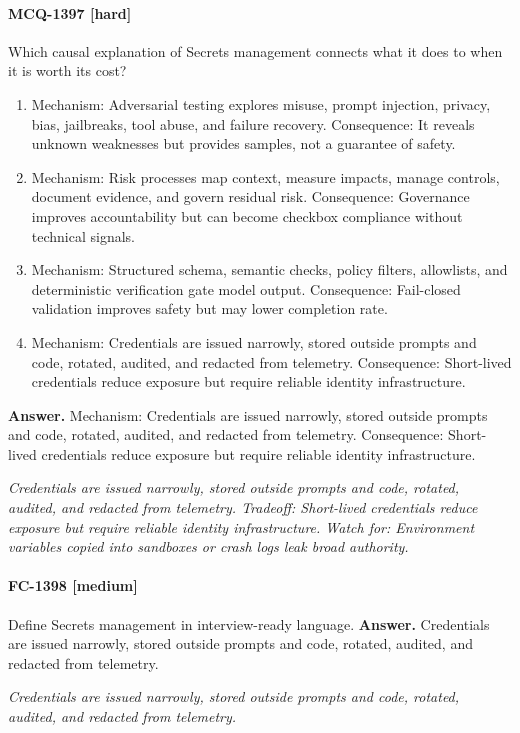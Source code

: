 \paragraph{MCQ-1397 [hard]} Which causal explanation of Secrets management connects what it does to when it is worth its cost?
\begin{enumerate}[label=\Alph*.]
\item Mechanism: Adversarial testing explores misuse, prompt injection, privacy, bias, jailbreaks, tool abuse, and failure recovery. Consequence: It reveals unknown weaknesses but provides samples, not a guarantee of safety.
\item Mechanism: Risk processes map context, measure impacts, manage controls, document evidence, and govern residual risk. Consequence: Governance improves accountability but can become checkbox compliance without technical signals.
\item Mechanism: Structured schema, semantic checks, policy filters, allowlists, and deterministic verification gate model output. Consequence: Fail-closed validation improves safety but may lower completion rate.
\item Mechanism: Credentials are issued narrowly, stored outside prompts and code, rotated, audited, and redacted from telemetry. Consequence: Short-lived credentials reduce exposure but require reliable identity infrastructure.
\end{enumerate}
\noindent\textbf{Answer.} Mechanism: Credentials are issued narrowly, stored outside prompts and code, rotated, audited, and redacted from telemetry. Consequence: Short-lived credentials reduce exposure but require reliable identity infrastructure.
\par\textit{Credentials are issued narrowly, stored outside prompts and code, rotated, audited, and redacted from telemetry. Tradeoff: Short-lived credentials reduce exposure but require reliable identity infrastructure. Watch for: Environment variables copied into sandboxes or crash logs leak broad authority.}
\paragraph{FC-1398 [medium]} Define Secrets management in interview-ready language.
\noindent\textbf{Answer.} Credentials are issued narrowly, stored outside prompts and code, rotated, audited, and redacted from telemetry.
\par\textit{Credentials are issued narrowly, stored outside prompts and code, rotated, audited, and redacted from telemetry.}
